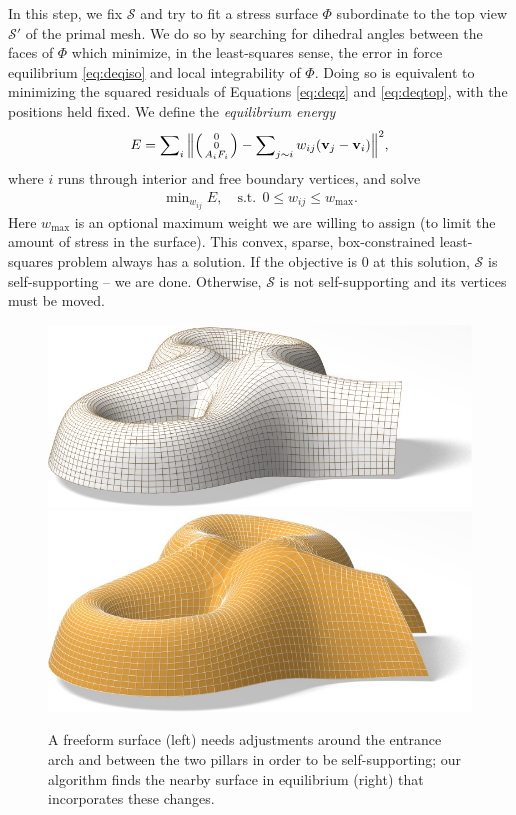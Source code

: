 \documentclass[annual]{acmsiggraph}
\makeatletter
\def\Forcevector{\Big(\mbox{\scriptsize
	\def\arraystretch{0.8}\begin{tabular}{@{\,}c@{\,}}
	0 \\ 0 \\ $A_i F_i$
	\end{tabular}}\Big)}
\def\SS{{\mathcal S}}
\makeatother
\begin{document}
In this step, we fix $\SS$ and try to fit a stress surface $\Phi$
subordinate to the top view $\SS'$ of the primal mesh. We do so by
searching for dihedral angles between the faces of $\Phi$ which minimize,
in the least-squares sense, the error in force equilibrium
\eqref{eq:deqiso} and local integrability of $\Phi$. Doing so is
equivalent to minimizing the squared residuals of Equations
\eqref{eq:deqz} and \eqref{eq:deqtop}, with the positions
held fixed. We define the {\em equilibrium energy}
	\begin{align}
	E = \sum\nolimits_i \Big\| \Forcevector -
		\sum\nolimits_{j\sim i} w_{ij} (\vw_j-\vw_i) \Big\|^2,
	\label{eq:eenergy}
	\end{align}
 where $i$ runs through interior and free boundary vertices, and
solve
	\begin{align}
	\min\nolimits_{w_{ij}} E,
	\quad
	\textrm{s.t.}\ \
		0 \leq w_{ij} \leq w_{\max}.
	\label{eq:wbounds}
	\end{align}
 Here $w_{\max}$ is an optional maximum weight we are willing to assign
(to limit the amount of stress in the surface). This convex, sparse,
box-constrained least-squares problem \cite{BCLS} always has a solution.
If the objective is $0$ at this solution, $\SS$ is self-supporting -- we are done. Otherwise, $\SS$
is not self-supporting and its vertices must be moved.

\begin{figure}[t]
	\centerline{\includegraphics[height=0.11\textwidth]{fig/cas.jpg}\relax
	\includegraphics[height=0.11\textwidth]{fig/cas-n.jpg}}
	\caption{A freeform surface
(left) needs adjustments around the entrance arch and between the two
pillars in order to be self-supporting; our algorithm finds the nearby
surface in equilibrium (right) that incorporates these
changes.}\label{fig:cas}
	 \end{figure}
\end{document}
